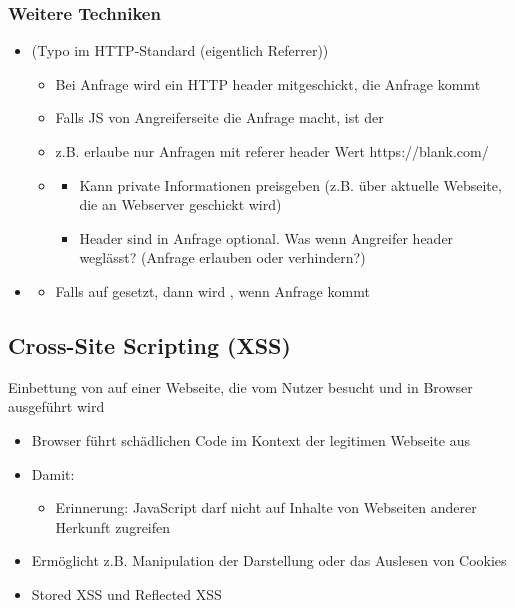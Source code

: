 \subsubsection*{Weitere Techniken}
\begin{itemize}
    \item {} (Typo im HTTP-Standard (eigentlich Referrer))
    \begin{itemize}
        \item Bei Anfrage wird ein HTTP header mitgeschickt,  die Anfrage kommt
        \item Falls JS von Angreiferseite die Anfrage macht, ist der 
        \item z.B. erlaube nur Anfragen mit referer header Wert https://blank.com/
        \item {}
        \begin{itemize}
            \item Kann private Informationen preisgeben (z.B. über aktuelle Webseite, die an Webserver geschickt wird)
            \item Header sind in Anfrage optional. Was wenn Angreifer header weglässt? (Anfrage erlauben oder verhindern?)
        \end{itemize}
    \end{itemize}
    \item {}
    \begin{itemize}
        \item Falls auf  gesetzt, dann wird , wenn Anfrage  kommt
    \end{itemize}
\end{itemize}
\subsection{Cross-Site Scripting (XSS)}
 Einbettung von  auf einer Webseite, die vom Nutzer besucht und in Browser ausgeführt wird
\begin{itemize}
    \item Browser führt schädlichen Code im Kontext der legitimen Webseite aus 
    \item Damit: 
    \begin{itemize}
        \item Erinnerung: JavaScript darf nicht auf Inhalte von Webseiten anderer Herkunft zugreifen
    \end{itemize}
    \item Ermöglicht z.B. Manipulation der Darstellung oder das Auslesen von Cookies
\end{itemize}
\begin{itemize}
    \item Stored XSS und Reflected XSS
\end{itemize}
